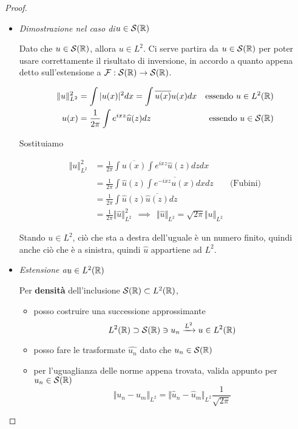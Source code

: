 \begin{proof}\leavevmode
\begin{itemize}
\item \textit{Dimostrazione nel caso di}$u\in \mathcal{S}(\mathbb{R})$

Dato che $u\in \mathcal{S}(\mathbb{R})$, allora $u\in L^{2}$. Ci serve partira da $u\in \mathcal{S}(\mathbb{R})$ per poter usare correttamente il risultato di inversione, in accordo a quanto appena detto sull'estensione a $\mathcal{F} : \mathcal{S}(\mathbb{R})\rightarrow \mathcal{S}(\mathbb{R})$.

\begin{equation*}
\begin{aligned}
\Vert u \Vert^{2}_{L^{2}} & = \int | u(x)|^{2} dx = \int \overline{u(x)} u(x) dx & \text{essendo} \ u\in L^{2}(\mathbb{R})\\
u(x) & = \frac{1}{2\pi}\int e^{ixz}\widehat{u}(z) dz & \text{essendo} \ u\in \mathcal{S}(\mathbb{R})
\end{aligned}
\end{equation*}

Sostituiamo

\begin{equation*}
\begin{aligned}
\Vert u \Vert^{2}_{L^{2}} & = \frac{1}{2\pi}\int \overline{u(x)}\int e^{ixz}\hat{u}(z) dzdx & \\
 & = \frac{1}{2\pi}\int \hat{u}(z)\int \overline{e^{- ixz} u(x)} dxdz & \text{(Fubini)}\\
 & = \frac{1}{2\pi}\int \hat{u}(z)\overline{\hat{u}(z)} dz & \\
 & = \frac{1}{2\pi} \Vert \hat{u} \Vert^{2}_{L^{2}} \ \ \implies \ \ \Vert \hat{u} \Vert_{L^{2}} = \sqrt{2\pi} \Vert u \Vert_{L^{2}} &
\end{aligned}
\end{equation*}

Stando $u\in L^{2}$, ciò che sta a destra dell'uguale è un numero finito, quindi anche ciò che è a sinistra, quindi $\hat{u}$ appartiene ad $L^{2}$.
\item \textit{Estensione a}$u\in L^{2}(\mathbb{R})$

Per \textbf{densità} dell'inclusione $\mathcal{S}(\mathbb{R}) \subset L^{2}(\mathbb{R})$,
\begin{itemize}
\item posso costruire una successione approssimante
\begin{equation*}
L^{2}(\mathbb{R}) \supset \mathcal{S}(\mathbb{R}) \ni u_{n}\xrightarrow{L^{2}} u\in L^{2}(\mathbb{R})
\end{equation*}
\item posso fare le trasformate $\widehat{u_{n}}$ dato che $u_{n} \in \mathcal{S}(\mathbb{R})$
\item per l'uguaglianza delle norme appena trovata, valida appunto per $u_{n} \in \mathcal{S}(\mathbb{R})$
\begin{equation*}
\Vert u_{n} - u_{m} \Vert_{L^{2}} = \Vert \hat{u}_{n} - \hat{u}_{m} \Vert_{L^{2}}\frac{1}{\sqrt{2\pi}}
\end{equation*}


\end{itemize}
\end{itemize}
\end{proof}
